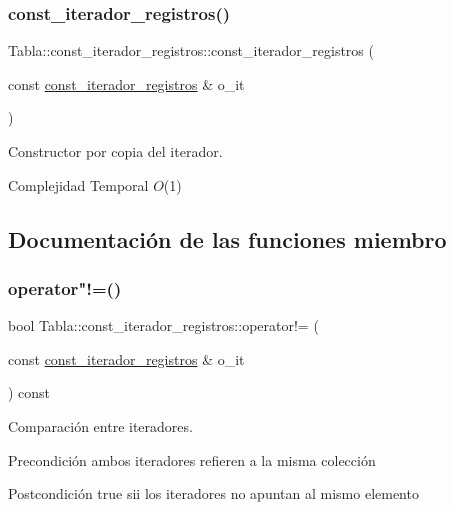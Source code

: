 \subsubsection{\texorpdfstring{const\+\_\+iterador\+\_\+registros()}{const\_iterador\_registros()}}
{\footnotesize\ttfamily Tabla\+::const\+\_\+iterador\+\_\+registros\+::const\+\_\+iterador\+\_\+registros (\begin{DoxyParamCaption}\item[{const \mbox{\hyperlink{classTabla_1_1const__iterador__registros}{const\+\_\+iterador\+\_\+registros}} \&}]{o\+\_\+it }\end{DoxyParamCaption})}



Constructor por copia del iterador. 


\begin{DoxyDescription}
\item[Complejidad Temporal]$O$(1)
\end{DoxyDescription}

\subsection{Documentación de las funciones miembro}
\mbox{\label{classTabla_1_1const__iterador__registros_a745133488ec23a775322844c4d6dda58}} 
\subsubsection{\texorpdfstring{operator"!=()}{operator!=()}}
{\footnotesize\ttfamily bool Tabla\+::const\+\_\+iterador\+\_\+registros\+::operator!= (\begin{DoxyParamCaption}\item[{const \mbox{\hyperlink{classTabla_1_1const__iterador__registros}{const\+\_\+iterador\+\_\+registros}} \&}]{o\+\_\+it }\end{DoxyParamCaption}) const}



Comparación entre iteradores. 

\begin{DoxyPrecond}{Precondición}
ambos iteradores refieren a la misma colección 
\end{DoxyPrecond}
\begin{DoxyPostcond}{Postcondición}
true sii los iteradores no apuntan al mismo elemento
\end{DoxyPostcond}

